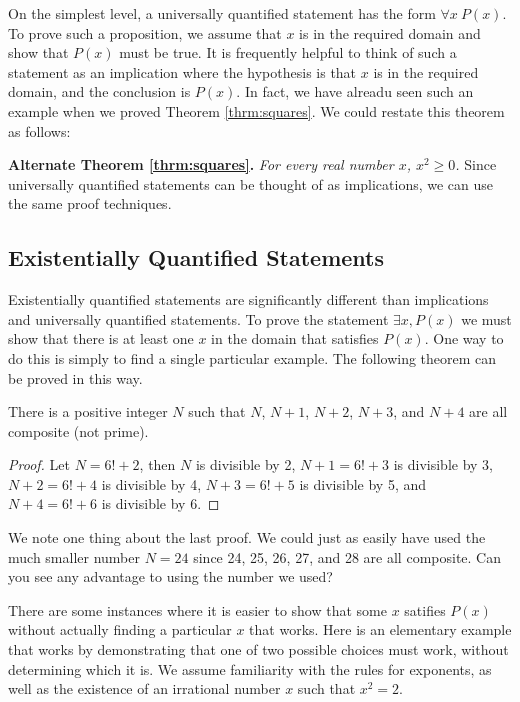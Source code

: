 On the simplest level, a universally quantified statement has the form $\forall x\ P(x)$. To prove such a proposition, we assume that $x$ is in the required domain and show that $P(x)$ must be true. It is frequently helpful to think of such a statement as an implication where the hypothesis is that $x$ is in the required domain, and the conclusion is $P(x)$. In fact, we have alreadu seen such an example when we proved Theorem \ref{thrm:squares}. We could restate this theorem as follows:

\smallbreak\noindent
{\bfseries Alternate Theorem \ref{thrm:squares}.} {\slshape For every real number $x$, $x^2\geq 0$.}
\smallbreak\noindent
Since universally quantified statements can be thought of as implications, we can use the same proof techniques.

\subsection{Existentially Quantified Statements}

Existentially quantified statements are significantly different than implications and universally quantified statements. To prove the statement $\exists x, P(x)$ we must show that there is at least one $x$ in the domain that satisfies $P(x)$. One way to do this is simply to find a single particular example. The following theorem can be proved in this way.

\begin{thrm}
There is a positive integer $N$ such that $N$, $N+1$, $N+2$, $N+3$, and $N+4$ are all composite (not prime).
\end{thrm}

\begin{proof}
Let $N=6!+2$, then $N$ is divisible by 2, $N+1=6!+3$ is divisible by 3, $N+2=6!+4$ is divisible by 4, $N+3=6!+5$ is divisible by 5, and $N+4=6!+6$ is divisible by 6.
\end{proof}

We note one thing about the last proof. We could just as easily have used the much smaller number $N=24$ since 24, 25, 26, 27, and 28 are all composite. Can you see any advantage to using the number we used?

There are some instances where it is easier to show that some $x$ satifies $P(x)$ without actually finding a particular $x$ that works. Here is an elementary example that works by demonstrating that one of two possible choices must work, without determining which it is. We assume familiarity with the rules for exponents, as well as the existence of an irrational number $x$ such that $x^2=2$. 

